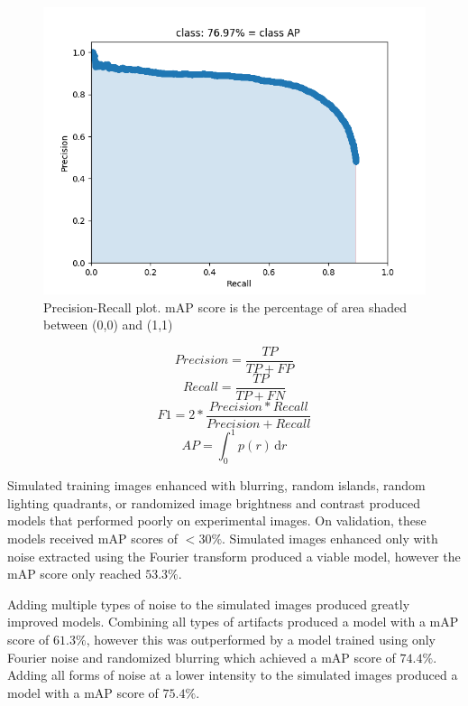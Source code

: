 \documentclass[prl,reprint,showpacs,floatfix,nofootinbib]{revtex4-1}
\begin{document}
\begin{figure}
  \includegraphics[width=\linewidth]{mAP.png}
  \caption{Precision-Recall plot. mAP score is the percentage of area shaded between (0,0) and (1,1)}
  \label{fig:Standardization and Noise}
\end{figure}

$$ Precision = \frac{TP}{TP+FP} $$
$$ Recall = \frac{TP}{TP+FN} $$
$$ F1 = 2*\frac{Precision * Recall}{Precision + Recall} $$
$$ AP = \int_0^1 \!p(r) \, \mathrm{d}r $$

Simulated training images enhanced with blurring, random islands, random lighting quadrants, or randomized image brightness and contrast produced models that performed poorly on experimental images. On validation, these models received mAP scores of $<30\%$. Simulated images enhanced only with noise extracted using the Fourier transform produced a viable model, however the mAP score only reached $53.3\%$.

Adding multiple types of noise to the simulated images produced greatly improved models. Combining all types of artifacts produced a model with a mAP score of $61.3\%$, however this was outperformed by a model trained using only Fourier noise and randomized blurring which achieved a mAP score of $74.4\%$. Adding all forms of noise at a lower intensity to the simulated images produced a model with a mAP score of $75.4\%$.   
\end{document}
